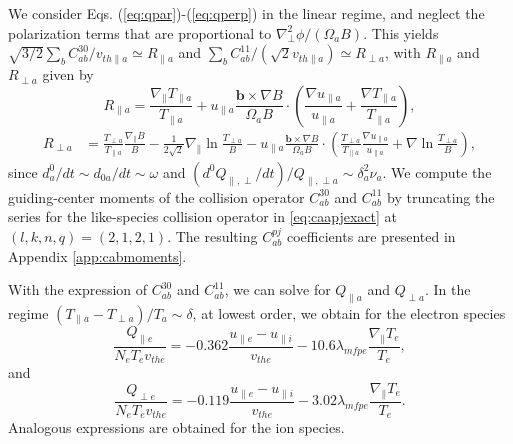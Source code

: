 {{{We consider Eqs. (\ref{eq:qpar})-(\ref{eq:qperp}) in the linear regime, and neglect the polarization terms that are proportional to $\nabla_\perp^2 \phi/(\Omega_a B)$.
{This yields $\sqrt{{3}/{2}}{\sum_b C_{ab}^{30}}/{v_{th\parallel a}} \simeq R_{\parallel a}$ and ${\sum_b C_{ab}^{11}}/(\sqrt{{2}}{v_{th\parallel a}}) \simeq R_{\perp a}$, with $R_{\parallel a}$ and $R_{\perp a}$ given by}
%
\begin{equation}
    R_{\parallel a} = \frac{\nabla_{\parallel} T_{\parallel a}}{T_{\parallel a}} +u_{\parallel a} \frac{\mathbf b \times \nabla B}{\Omega_a B}\cdot \left(\frac{\nabla u_{\parallel a}}{u_{\parallel a}}+\frac{\nabla T_{\parallel a}}{T_{\parallel a}}\right),
    \label{eq:collimit1}
\end{equation}
\begin{equation}
\begin{split}
    R_{\perp a} &= \frac{T_{\perp a}}{T_{\parallel a}}\frac{\nabla_{\parallel} B}{B} - \frac{1}{2\sqrt{2}}\nabla_{\parallel} \ln \frac{T_{\perp a}}{B}-u_{\parallel a} \frac{\mathbf b \times \nabla B}{\Omega_a B}\cdot \left(\frac{T_{\perp a}}{T_{\parallel a}}\frac{\nabla u_{\parallel a}}{u_{\parallel a}}+\nabla \ln \frac{T_{\perp a}}{B}\right),
\end{split}
\label{eq:collimit2}
\end{equation}
%
since $d_a^0/dt \sim d_{0 a}/dt \sim \omega{}$ and $(d^0 Q_{\parallel, \perp }/dt)/Q_{\parallel,\perp a} \sim \delta_a^2 \nu_a$.
We compute the guiding-center moments of the collision operator $C_{ab}^{30}$ and $C_{ab}^{11}$ by truncating the series for the like-species collision operator in \cref{eq:caapjexact} at $(l,k,n,q)=(2,1,2,1)$.
The resulting $C_{ab}^{pj}$ coefficients are presented in Appendix \ref{app:cabmoments}.

With the expression of $C_{ab}^{30}$ and $C_{ab}^{11}$, we can solve for $Q_{\parallel a}$ and $Q_{\perp a}$. In the regime $(T_{\parallel a}-T_{\perp a})/T_a \sim \delta$, at lowest order, we obtain for the electron species
%
\begin{equation}
    \frac{Q_{\parallel e}}{N_e T_{ e} v_{th e}} =-0.362 \frac{u_{\parallel e}-u_{\parallel i}}{v_{th e}}-10.6 \lambda_{mfpe}\frac{\nabla_\parallel T_e}{T_e},
    \label{eq:qpare}
\end{equation}
%
and
%
\begin{equation}
    \frac{Q_{\perp e}}{N_e T_{ e} v_{th e}} =-0.119 \frac{u_{\parallel e}-u_{\parallel i}}{v_{th e}}-3.02 \lambda_{mfpe}\frac{\nabla_\parallel T_e}{T_e}.
\label{eq:qperpe}
\end{equation}
%
Analogous expressions are obtained for the ion species.

}}}
